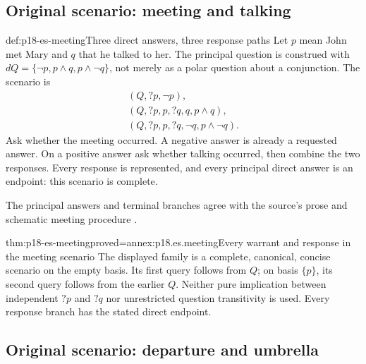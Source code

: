 \subsection{Original scenario: meeting and talking}

\begin{hbexample}{def:p18-es-meeting}{Three direct answers, three response paths}
Let \(p\) mean John met Mary and \(q\) that he talked to her. The principal
question is construed with \(dQ=\{\neg p,p\land q,p\land\neg q\}\),
not merely as a polar question about a conjunction. The scenario is
\[
\begin{array}{l}
 (Q,?p,\neg p),\\
 (Q,?p,p,?q,q,p\land q),\\
 (Q,?p,p,?q,\neg q,p\land\neg q).
\end{array}
\]
Ask whether the meeting occurred. A negative answer is already a requested
answer. On a positive answer ask whether talking occurred, then combine
the two responses. Every response is represented, and every principal
direct answer is an endpoint: this scenario is complete.

The principal answers and terminal branches agree with the source's
prose and schematic meeting procedure
\cite[pp.~31,38]{Wisniewski2001QuestionsInferences}.
\end{hbexample}

\begin{hbtheorem}{thm:p18-es-meeting}{proved=annex:p18.es.meeting}{Every warrant and response in the meeting scenario}
The displayed family is a complete, canonical, concise scenario on the empty
basis. Its first query follows from \(Q\); on basis \(\{p\}\), its second
query follows from the earlier \(Q\). Neither pure implication between
independent \(?p\) and \(?q\) nor unrestricted question transitivity is used.
Every response branch has the stated direct endpoint.
\end{hbtheorem}

\subsection{Original scenario: departure and umbrella}

